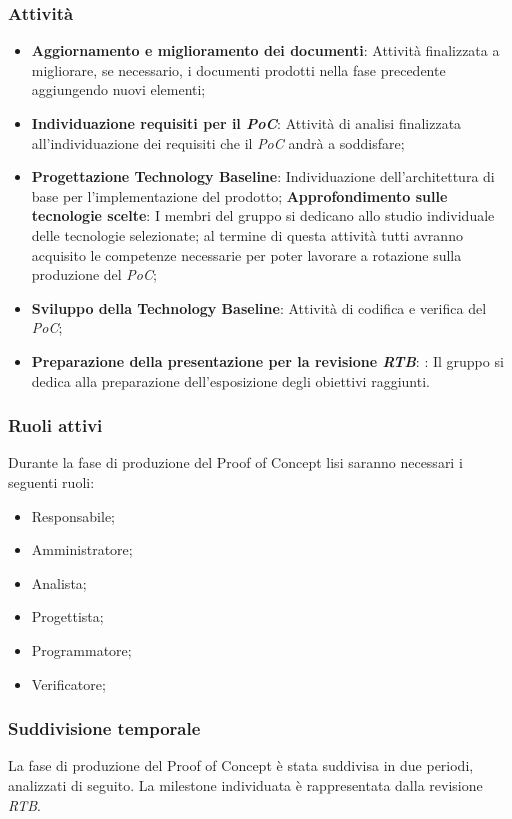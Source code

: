 \subsubsection{Attività}
\begin{itemize}
	\item \textbf{Aggiornamento e miglioramento dei documenti}: Attività finalizzata a migliorare, se necessario, i documenti prodotti nella fase precedente aggiungendo nuovi elementi;
	\item \textbf{Individuazione requisiti per il \textit{PoC}}: Attività di analisi finalizzata all’individuazione dei requisiti che il \textit{PoC} andrà a soddisfare;
    \item \textbf{Progettazione Technology Baseline}: Individuazione dell’architettura di base per l’implementazione del prodotto;
        \subitem \textbf{Approfondimento sulle tecnologie scelte}: I membri del gruppo si dedicano allo studio individuale delle tecnologie selezionate; al termine di questa attività tutti avranno acquisito le competenze necessarie per poter lavorare a rotazione sulla produzione del \textit{PoC};
    \item \textbf{Sviluppo della Technology Baseline}: Attività di codifica e verifica del \textit{PoC};
    \item \textbf{Preparazione della presentazione per la revisione \textit{RTB}}: : Il gruppo si dedica alla preparazione dell’esposizione degli obiettivi raggiunti.
\end{itemize}

\subsubsection{Ruoli attivi}
Durante la fase di produzione del Proof of Concept lisi saranno necessari i seguenti ruoli:
\begin{itemize}
	\item Responsabile;
    \item Amministratore;
    \item Analista;
    \item Progettista;
    \item Programmatore;
    \item Verificatore;
\end{itemize}

\subsubsection{Suddivisione temporale}
La fase di produzione del Proof of Concept è stata suddivisa in due periodi, analizzati di seguito. La milestone individuata è rappresentata dalla revisione \textit{RTB}.

